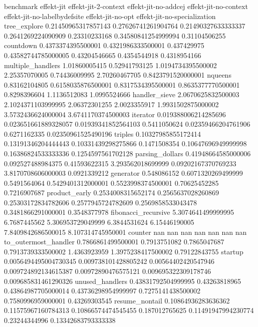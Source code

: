 benchmark	effekt-jit	effekt-jit-2-context	effekt-jit-no-addcej	effekt-jit-no-context	effekt-jit-no-labelbydefsite	effekt-jit-no-opt	effekt-jit-no-specialization
tree_explore	0.21450965317857143	0.27626741261904764	0.21490327633333337	0.2641269224090909	0.23310233168	0.34580841254999994	0.31104506255
countdown	0.4373374395500001	0.4321986333500001	0.437429975	0.43582744785000005	0.43204546665	0.4354544918	0.4318954166
multiple_handlers	1.01860005415	0.52941793125	1.0194734395500002	2.25357070005	0.74436009995	2.70260467705	0.8423791520000001
nqueens	0.83162104805	0.6158035876500001	0.8317534395500001	0.8635377770500001	0.8298396604	1.1136512083	1.0995524666
handler_sieve	2.0670625832500003	2.1024371103999995	2.06372301255	2.0023355917	1.9931502875000002	3.5732436624000004	3.6741170374500003
iterator	0.019388006214285696	0.023651661889328057	0.01939341852564103	0.5411050624	0.02359466204761906	0.6271162335	0.02350961525490196
triples	0.10327985855172414	0.13191346204444443	0.10331439298275866	0.1471508354	0.10647696949999998	0.16386824533333336	0.1254597561702128
parsing_dollars	0.41948664585000006	0.092527488984375	0.41593622315	3.293562018699999	0.09202167370769233	3.8170708606000003	0.0921339212
generator	0.548086152	0.6071320269499999	0.5491564064	0.5429401312000001	0.5523998374500001	0.70625452285	0.7216907687
product_early	0.2534008315652174	0.2565637028260869	0.25303172834782606	0.2577945724782609	0.2569858533043478	0.3481866291000001	0.3548377978
fibonacci_recursive	5.3074641499999995	6.7687445562	5.306953729049999	6.3844531624	6.15446190005	7.8409842686500015	8.107314745950001
counter	nan	nan	nan	nan	nan	nan	nan
to_outermost_handler	0.7866861499500001	0.7913751082	0.7865047687	0.7913739333500002	1.4363923959	1.3975238417500002	0.79122843755
startup	0.0056494495004730345	0.009738101428805242	0.00564402420547946	0.009724892134615387	0.00972890476575121	0.009695322309178746	0.009685831461290326
unused_handlers	0.43831792504999995	0.43263818965	0.43864987705000014	0.43736298954999997	0.7275141438500002	0.7580996959000001	0.43269303545
resume_nontail	0.10864936283636362	0.11575967160784313	0.10866574474545455	0.187012765625	0.11491947994230774	0.23244344996	0.13342683793333338
